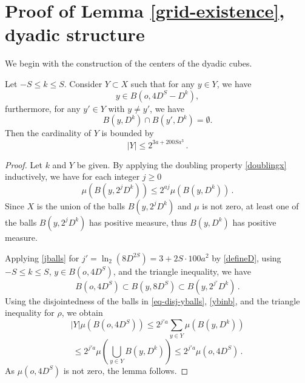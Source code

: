 \section{Proof of Lemma \ref{grid-existence}, dyadic structure}
\label{subsecdyadic}

We begin with the construction of the centers of the dyadic cubes.
\begin{lemma}
\label{counting-balls}
Let $-S\le k\le S$. Consider $Y\subset X$ such that for any $y\in Y$, we have
\begin{equation}\label{ybinb}
  y\in B(o,4D^S-D^k),
\end{equation}
furthermore, for any $y'\in Y$ with $y\neq y'$, we have
\begin{equation} \label{eq-disj-yballs}
    B(y,D^k)\cap B(y',D^k)=\emptyset.
\end{equation}
Then the cardinality of $Y$ is bounded by
\begin{equation}\label{boundY}
    |Y|\le 2^{3a + 200Sa^3}\, .
\end{equation}
\end{lemma}


\begin{proof}
Let $k$ and $Y$ be given. By applying the doubling property \eqref{doublingx} inductively, we have for each integer $j\ge 0$
\begin{equation}\label{jballs}
    \mu(B(y,2^{j}D^k))\le 2^{aj} \mu(B(y,D^k))\, .
\end{equation}
Since $X$ is the union of the balls $B(y,2^{j}D^k)$ and $\mu$ is not zero, at least one of the balls $B(y,2^{j}D^k)$ has positive measure, thus $B(y,D^k)$ has positive measure.

Applying \eqref{jballs} for $j' = \ln_2(8D^{2S}) = 3 + 2S \cdot 100a^2$ by \eqref{defineD}, using $-S\le k\le S$, $y\in B(o,4D^S)$, and the triangle inequality, we have
\begin{equation}
    B(o, 4D^S) \subset B(y, 8D^S) \subset B(y,2^{j'}D^k) \, .
\end{equation}
Using the disjointedness of the balls in \eqref{eq-disj-yballs}, \eqref{ybinb}, and the triangle inequality for $\rho$, we obtain
\begin{equation}
|Y|\mu(B(o,4D^S))\le 2^{j'a}\sum_{y\in Y}\mu(B(y,D^k))
\end{equation}
\begin{equation}
\le
2^{j'a}\mu(\bigcup_{y\in Y}B(y,D^k))
\le 2^{j'a}\mu(o,4D^S)\, .
\end{equation}
As $\mu(o,4D^S)$ is not zero, the lemma follows.
\end{proof}

